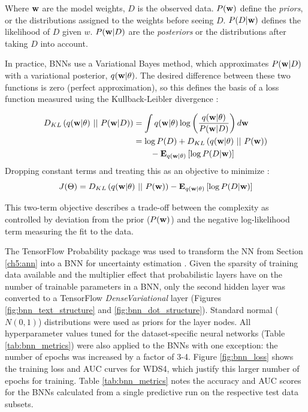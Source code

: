 Where ${\bf w}$ are the model weights, $D$ is the observed data. $P({\bf w})$ define the \textit{priors}, or the distributions assigned to the weights before seeing $D$. $P(D \vert {\bf w})$ defines the likelihood of $D$ given $w$. $P({\bf w} \vert D)$ are the \textit{posteriors} or the distributions after taking $D$ into account.

In practice, BNNs use a Variational Bayes method, which approximates $P({\bf w} \vert D)$ with a variational posterior, $q({\bf w} \vert \theta)$. The desired difference between these two functions is zero (perfect approximation), so this defines the basis of a loss function measured using the Kullback-Leibler divergence \citep{webster_probabilistic_2021}:

\begin{equation}
    \label{eq:bnn_loss}
    \begin{aligned}
    D_{KL}\left(q({\bf w} \vert \theta)\ \vert\vert\ P({\bf w} \vert D)\right) &= \int{q({\bf w} \vert \theta) \log \left({\frac{q({\bf w} \vert \theta)}{P({\bf w} \vert D)}}\right) d{\bf w}} \\
    &= \log P(D) + D_{KL}\left(q({\bf w} \vert \theta)\ \vert\vert\ P({\bf w})\right) \\ 
    &\qquad- \mathbf{E}_{q({\bf w} \vert \theta)}\left[\log P(D \vert {\bf w})\right]
    \end{aligned}
\end{equation}
Dropping constant terms and treating this as an objective to minimize \citep{blundell_weight_2015}:
\begin{equation}
    \label{eq:bnn_objective}
    J(\Theta) = D_{KL}\left(q({\bf w} \vert \theta)\ \vert\vert\ P({\bf w})\right) - \mathbf{E}_{q({\bf w} \vert \theta)}\left[\log P(D \vert {\bf w})\right]
\end{equation}

This two-term objective describes a trade-off between the complexity as controlled by deviation from the prior ($P({\bf w})$) and the negative log-likelihood term measuring the fit to the data.

The TensorFlow Probability package was used to transform the NN from Section \ref{ch5:ann} into a BNN for uncertainty estimation \citep{dillon_tensorflow_2017}.  Given the sparsity of training data available and the multiplier effect that probabilistic layers have on the number of trainable parameters in a BNN, only the second hidden layer was converted to a TensorFlow \textit{DenseVariational} layer (Figures \ref{fig:bnn_text_structure} and \ref{fig:bnn_dot_structure}). Standard normal ($N(0,1)$) distributions were used as priors for the layer nodes. All hyperparameter values tuned for the dataset-specific neural networks (Table \ref{tab:bnn_metrics}) were also applied to the BNNs with one exception: the number of epochs was increased by a factor of 3-4. Figure \ref{fig:bnn_loss} shows the training loss and AUC curves for WDS4, which justify this larger number of epochs for training. Table \ref{tab:bnn_metrics} notes the accuracy and AUC scores for the BNNs calculated from a single predictive run on the respective test data subsets.

